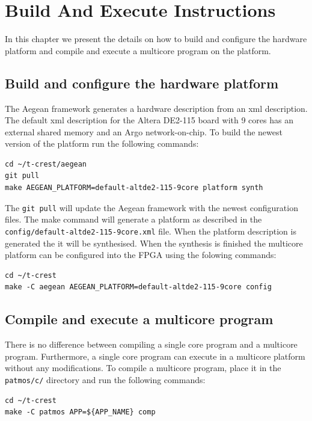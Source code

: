 \documentclass[a4paper,fontsize=10pt,twoside,DIV15,BCOR12mm,headinclude=true,footinclude=false,pagesize,bibtotoc]{scrbook}
\newcommand{\code}[1]{{\texttt{#1}}}
\begin{document}
\chapter{Build And Execute Instructions}
\label{apx:build}

In this chapter we present the details on how to 
build and configure the hardware platform and compile and execute 
a multicore program on the platform.

\section{Build and configure the hardware platform}
\label{apx:buildhw}

The Aegean framework generates a hardware description from an
xml description.
The default xml description for the Altera DE2-115 board with 9 cores
has an external shared memory and an Argo network-on-chip.
To build the newest version of the platform run the following commands:
\begin{Verbatim}
cd ~/t-crest/aegean
git pull
make AEGEAN_PLATFORM=default-altde2-115-9core platform synth
\end{Verbatim}
The \code{git pull} will update the Aegean framework with the newest
configuration files.
The make command will generate a platform as described in the
\code{config/default-altde2-115-9core.xml} file.
When the platform description is generated the it will be synthesised.
When the synthesis is finished the multicore platform can be
configured into the FPGA using the folowing commands:
\begin{Verbatim}
cd ~/t-crest
make -C aegean AEGEAN_PLATFORM=default-altde2-115-9core config
\end{Verbatim}

\section{Compile and execute a multicore program}
\label{apx:buildsw}

There is no difference between compiling a single core program and a multicore program.
Furthermore, a single core program can execute in a multicore
platform without any modifications.
To compile a multicore program, place it in the \code{patmos/c/} directory
and run the following commands:

\begin{Verbatim}
cd ~/t-crest
make -C patmos APP=${APP_NAME} comp
\end{Verbatim}
\end{document}
